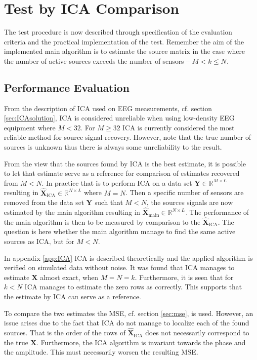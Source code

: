 \section{Test by ICA Comparison}\label{seg:main_test_description}
The test procedure is now described through specification of the evaluation criteria and the practical implementation of the test.
Remember the aim of the implemented main algorithm is to estimate the source matrix in the case where the number of active sources exceeds the number of sensors -- $M < k \leq N$.

\subsection{Performance Evaluation}
From the description of ICA used on EEG measurements, cf. section \ref{sec:ICAsolution}, ICA is considered unreliable when using low-density EEG equipment where $M < 32$. 
For $M \geq 32$ ICA is currently considered the most reliable method for  source signal recovery. 
However, note that the true number of sources is unknown thus there is always some unreliability to the result. 

From the view that the sources found by ICA is the best estimate, it is possible to let that estimate serve as a reference for comparison of estimates recovered from $M < N$. 
In practice that is to perform ICA on a data set $\mathbf{Y} \in \mathbb{R}^{M \times L}$ resulting in $\hat{\mathbf{X}}_{\text{ICA}} \in \mathbb{R}^{N \times L}$ where $M = N$. 
Then a specific number of sensors are removed from the data set $\mathbf{Y}$ such that $M < N$, the sources signals are now estimated by the main algorithm resulting in $\hat{\textbf{X}}_{\text{main}}\in \mathbb{R}^{N \times L}$. 
The performance of the main algorithm is then to be measured by comparison to the $\hat{\mathbf{X}}_{\text{ICA}}$. 
The question is here whether the main algorithm manage to find the same active sources as ICA, but for $M < N$.

In appendix \ref{app:ICA} ICA is described theoretically and the applied algorithm is verified on simulated data without noise. 
It was found that ICA manages to estimate $\mathbf{X}$ almost exact, when $M = N = k$. 
Furthermore, it is seen that for $k < N$ ICA manages to estimate the zero rows as correctly. 
This supports that the estimate by ICA can serve as a reference.     

To compare the two estimates the MSE, cf. section \ref{sec:mse}, is used. 
However, an issue arises due to the fact that ICA do not manage to localize each of the found sources. 
That is the order of the rows of $\hat{\mathbf{X}}_{\text{ICA}}$ does not necessarily correspond to the true $\mathbf{X}$. 
Furthermore, the ICA algorithm is invariant towards the phase and the amplitude. 
This must necessarily worsen the resulting MSE.  

